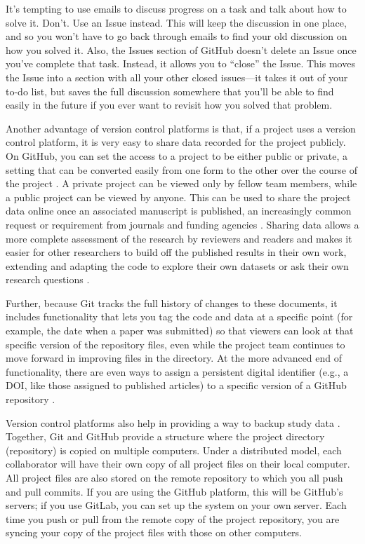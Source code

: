 \documentclass[]{tufte-book}
\begin{document}
It's tempting to use emails to discuss progress on a task and talk about how
to solve it. Don't. Use an Issue instead. This will keep the discussion in one
place, and so you won't have to go back through emails to find your old
discussion on how you solved it. Also, the Issues section of GitHub doesn't
delete an Issue once you've complete that task. Instead, it allows you to ``close''
the Issue. This moves the Issue into a section with all your other closed
issues---it takes it out of your to-do list, but saves the full discussion
somewhere that you'll be able to find easily in the future if you ever want to
revisit how you solved that problem.

Another advantage of version control platforms is that, if a project uses a
version control platform, it is very easy to share data recorded for the project
publicly. On GitHub, you can set the access to a project to be either public or
private, a setting that can be converted easily from one form to the other over
the course of the project \citep{metz2015github}. A private project can be viewed
only by fellow team members, while a public project can be viewed by anyone.
This can be used to share the project data online once an associated manuscript
is published, an increasingly common request or requirement from journals and
funding agencies \citep{blischak2016quick}. Sharing data allows a more complete
assessment of the research by reviewers and readers and makes it easier for
other researchers to build off the published results in their own work,
extending and adapting the code to explore their own datasets or ask their own
research questions \citep{perez2016ten}.

Further, because Git tracks the full history of changes to
these documents, it includes functionality that lets you tag the code and data
at a specific point (for example, the date when a paper was submitted) so that
viewers can look at that specific version of the repository files, even while
the project team continues to move forward in improving files in the directory.
At the more advanced end of functionality, there are even ways to assign a
persistent digital identifier (e.g., a DOI, like those assigned to published articles)
to a specific version of a GitHub repository \citep{perez2016ten}.

Version control platforms also help in providing a way to backup study data
\citep{blischak2016quick, perez2016ten, perkel2018git}. Together, Git and GitHub
provide a structure where the project directory (repository) is copied on
multiple computers. Under a distributed model, each collaborator will
have their own copy of all project files on their local computer. All project
files are also stored on the remote repository to which you all push and pull
commits. If you are using the GitHub platform, this will be GitHub's servers; if
you use GitLab, you can set up the system on your own server. Each time you push
or pull from the remote copy of the project repository, you are syncing your
copy of the project files with those on other computers.
\end{document}
